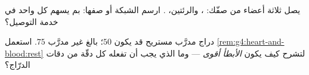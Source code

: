 \begin{exercise}[$\star\star$]\label{exo:g4:heart-and-blood:10}
 يصل ثلاثة أعضاء من صفّك: ، والرئتين، .
ارسم الشبكة أو صفها: بم يسهم كل واحد في خدمة التوصيل؟
\end{exercise}

\begin{exercise}[$\star\star\star$]\label{exo:g4:heart-and-blood:11}
 دراج مدرَّب مستريح قد يكون $50$؛  بالغ غير مدرَّب $75$.
استعمل \cref{rem:g4:heart-and-blood:rest} لتشرح كيف يكون
\emph{الأبطأ} \emph{أقوى} --- وما الذي يجب أن تفعله كل دقّة من دقات
الدرّاج؟
\end{exercise}
